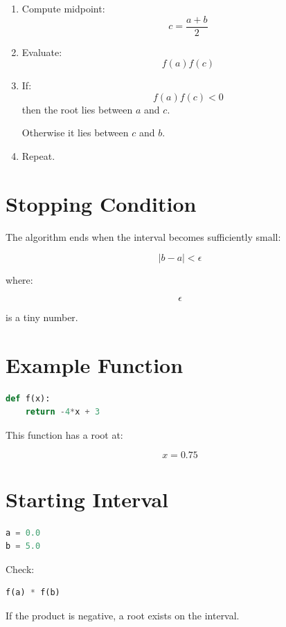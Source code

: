 \documentclass[11pt]{article}
\begin{document}
\begin{enumerate}
    \item Compute midpoint:
    \[
    c = \frac{a+b}{2}
    \]

    \item Evaluate:
    \[
    f(a)f(c)
    \]

    \item If:
    \[
    f(a)f(c) < 0
    \]
    then the root lies between \(a\) and \(c\).

    Otherwise it lies between \(c\) and \(b\).

    \item Repeat.
\end{enumerate}

\section{Stopping Condition}

The algorithm ends when the interval becomes sufficiently small:

\[
|b-a| < \epsilon
\]

where:

\[
\epsilon
\]

is a tiny number.

\section{Example Function}

\begin{lstlisting}[language=Python]
def f(x):
    return -4*x + 3
\end{lstlisting}

This function has a root at:

\[
x = 0.75
\]

\section{Starting Interval}

\begin{lstlisting}[language=Python]
a = 0.0
b = 5.0
\end{lstlisting}

Check:

\begin{lstlisting}[language=Python]
f(a) * f(b)
\end{lstlisting}

If the product is negative, a root exists on the interval.
\end{document}
